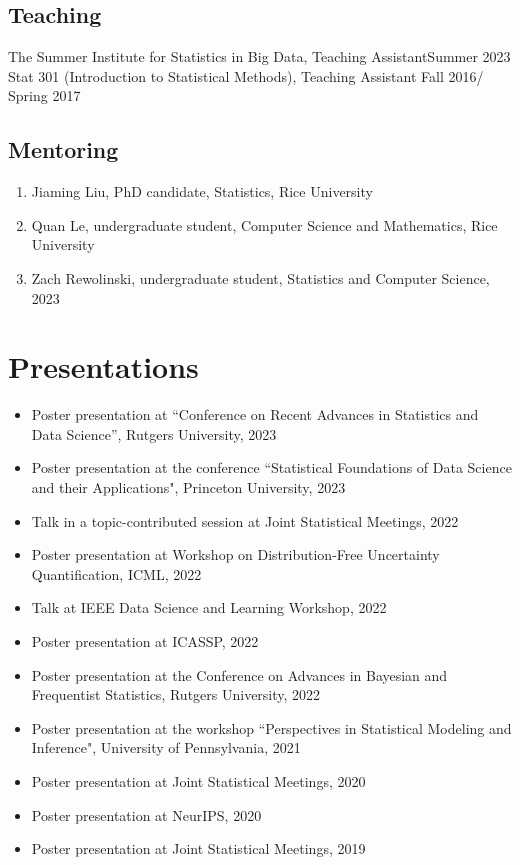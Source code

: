 \documentclass[letterpaper,11pt]{article}
\begin{document}
	\subsection*{Teaching}
	The Summer Institute for Statistics in Big Data, Teaching Assistant\hfill Summer 2023\\
	Stat 301 (Introduction to Statistical Methods), Teaching Assistant \hfill Fall 2016/ Spring 2017
	\subsection*{Mentoring}
	\begin{enumerate}
		\item Jiaming Liu, PhD candidate, Statistics, Rice University
		\item Quan Le, undergraduate student, Computer Science and Mathematics, Rice University
		\item Zach Rewolinski, undergraduate student, Statistics and Computer Science, 2023
	\end{enumerate}
	\section{Presentations}
	\begin{itemize}
		\item Poster presentation at ``Conference on Recent Advances in Statistics and Data Science'', Rutgers University, 2023
		\item Poster presentation at the conference ``Statistical Foundations of Data Science and their Applications", Princeton University, 2023
		\item Talk in a topic-contributed session at Joint Statistical Meetings, 2022
		\item Poster presentation at Workshop on Distribution-Free Uncertainty Quantification, ICML, 2022
		\item Talk at IEEE Data Science and Learning Workshop, 2022
		\item Poster presentation at ICASSP, 2022
		\item Poster presentation at the Conference on Advances in Bayesian and Frequentist Statistics, Rutgers University, 2022
		\item Poster presentation at the workshop ``Perspectives in Statistical Modeling and Inference", University of Pennsylvania, 2021
		\item Poster presentation at Joint Statistical Meetings, 2020
		\item Poster presentation at NeurIPS, 2020
		\item Poster presentation at Joint Statistical Meetings, 2019 
	\end{itemize}
\end{document}
